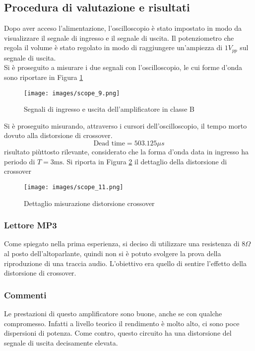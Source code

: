 \subsection{Procedura di valutazione e risultati}
Dopo aver acceso l'alimentazione, l'oscilloscopio è stato impostato in modo da visualizzare il segnale di ingresso e il segnale di uscita. Il potenziometro che regola il volume è stato regolato in modo di raggiungere un'ampiezza di $1V_{pp}$ sul segnale di uscita.\\
Si è proseguito a misurare i due segnali con l'oscilloscopio, le cui forme d'onda sono riportare in Figura \ref{fig:scope_9} 
\begin{figure}[H]
    \centering
    \texttt{[image: images/scope\_9.png]}
    \caption{Segnali di ingresso e uscita dell'amplificatore in classe B}
    \label{fig:scope_9}
\end{figure}
Si è proseguito misurando, attraverso i cursori dell'oscilloscopio, il tempo morto dovuto alla distorsione di crossover.
\begin{equation*}
    \text{Dead time} = 503.125\mu s
\end{equation*}
risultato piùttosto rilevante, considerato che la forma d'onda data in ingresso ha periodo di $T=3\text{ms}$. Si riporta in Figura \ref{fig:scope_11} il dettaglio della distorsione di crossover
\begin{figure}[H]
    \centering
    \texttt{[image: images/scope\_11.png]}
    \caption{Dettaglio misurazione distorsione crossover}
    \label{fig:scope_11}
\end{figure}
\subsubsection{Lettore MP3}
Come spiegato nella prima esperienza, si deciso di utilizzare una resistenza di 8$\Omega$ al posto dell'altoparlante, quindi non si è potuto svolgere la prova della riproduzione di una traccia audio. L'obiettivo era quello di sentire l'effetto della distorsione di crossover.
\subsubsection{Commenti}
Le prestazioni di questo amplificatore sono buone, anche se con qualche compromesso. Infatti a livello teorico il rendimento è molto alto, ci sono poce dispersioni di potenza. Come contro, questo circuito ha una distorsione del segnale di uscita decisamente elevata.